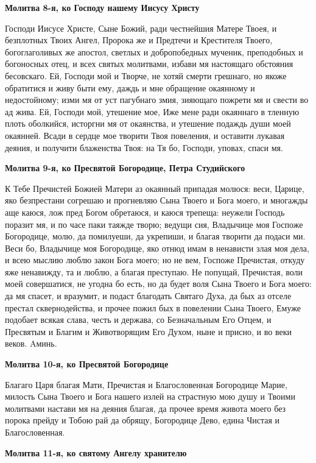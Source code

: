\medskip
\bfseries Молитва 8-я, ко Господу нашему Иисусу Христу\normalfont{}


Господи Иисусе Христе, Сыне Божий, ради честнейшия Матере Твоея, и безплотных Твоих Ангел, Пророка же и Предтечи и Крестителя Твоего, богоглаголивых же апостол, светлых и добропобедных мученик, преподобных и богоносных отец, и всех святых молитвами, избави мя настоящаго обстояния бесовскаго. Ей, Господи мой и Творче, не хотяй смерти грешнаго, но якоже обратитися и живу быти ему, даждь и мне обращение окаянному и недостойному; изми мя от уст пагубнаго змия, зияющаго пожрети мя и свести во ад жива. Ей, Господи мой, утешение мое, Иже мене ради окаяннаго в тленную плоть оболкийся, исторгни мя от окаянства, и утешение подаждь души моей окаянней. Всади в сердце мое творити Твоя повеления, и оставити лукавая деяния, и получити блаженства Твоя: на Тя бо, Господи, уповах, спаси мя.


\medskip
\bfseries Молитва 9-я, ко Пресвятой Богородице, Петра Студийского\normalfont{}


К Тебе Пречистей Божией Матери аз окаянный припадая молюся: веси, Царице, яко безпрестани согрешаю и прогневляю Сына Твоего и Бога моего, и многажды аще каюся, лож пред Богом обретаюся, и каюся трепеща: неужели Господь поразит мя, и по часе паки таяжде творю; ведущи сия, Владычице моя Госпоже Богородице, молю, да помилуеши, да укрепиши, и благая творити да подаси ми. Веси бо, Владычице моя Богородице, яко отнюд имам в ненависти злая моя дела, и всею мыслию люблю закон Бога моего; но не вем, Госпоже Пречистая, откуду яже ненавижду, та и люблю, а благая преступаю. Не попущай, Пречистая, воли моей совершатися, не угодна бо есть, но да будет воля Сына Твоего и Бога моего: да мя спасет, и вразумит, и подаст благодать Святаго Духа, да бых аз отселе престал сквернодейства, и прочее пожил бых в повелении Сына Твоего, Емуже подобает всякая слава, честь и держава, со Безначальным Его Отцем, и Пресвятым и Благим и Животворящим Его Духом, ныне и присно, и во веки веков. Aминь.


\medskip
\bfseries Молитва 10-я, ко Пресвятой Богородиц\normalfont{}е


Благаго Царя благая Мати, Пречистая и Благословенная Богородице Марие, милость Сына Твоего и Бога нашего излей на страстную мою душу и Твоими молитвами настави мя на деяния благая, да прочее время живота моего без порока прейду и Тобою рай да обрящу, Богородице Дево, едина Чистая и Благословенная.


\medskip
\bfseries Молитва 11-я, ко святому Ангелу хранителю\normalfont{}


